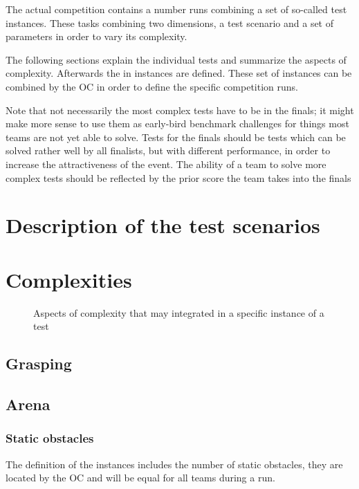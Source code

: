 
The actual competition contains a number runs combining a set of so-called
test instances. These tasks combining two dimensions, a test scenario and a
set of parameters in order to vary its complexity.

The following sections explain the individual tests and summarize the aspects of
complexity. Afterwards the in instances are defined. These set of instances can
be combined by the OC in order to define the specific competition runs.

Note that not necessarily the most complex tests have to be in the finals;
it might make more sense to use them as early-bird benchmark challenges for
things most teams are not yet able to solve. Tests for the finals should be
tests which can be solved rather well by all finalists, but with different
performance, in order to increase the attractiveness of the event. The ability
of a team to solve more complex tests should be reflected by the prior score
the team takes into the finals

\section{Description of the test scenarios}



\section{Complexities}


\begin{figure}[ht]
\centering

\caption{Aspects of complexity that may integrated in a specific instance of a test}
\end{figure}



\subsection{Grasping}


\subsection{Arena}

\subsubsection{Static obstacles}
The definition of the instances includes the number of static obstacles, they
are located by the OC and will be equal for all teams during a run.




